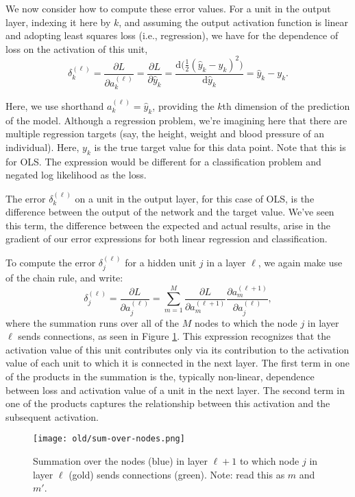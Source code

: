 We now consider how to compute these error values.  For a unit in the output layer, indexing it here by $k$,  and assuming the output activation function is linear and adopting least squares loss (i.e., regression), we have  for the dependence of loss on the activation of this unit,
%
\begin{equation*}
  \delta^{(\ell)}_{k} = \frac{\partial L}{\partial a^{(\ell)}_k} =
 \frac{\partial L}{\partial \hat{y}_k} =
  \frac{\mathrm{d} \big( \frac{1}{2}(\hat{y}_k- y_k)^2 \big)}{\mathrm{d} \hat{y}_{k}} = \hat{y}_{k} - y_{k}.
\end{equation*}

Here, we use shorthand $a^{(\ell)}_k=\hat{y}_k$, providing the $k$th dimension of the  prediction  of the  model. Although a regression problem, we're imagining here that there are multiple regression targets (say, the height, weight and blood pressure of an individual). Here, $y_k$ is the true target value for this data point. Note that this is for OLS. The expression would be different for a classification problem and negated log likelihood as the loss.

The error $\delta_k^{(\ell)}$ on a unit in the output layer, for this case of OLS, is the difference between the output of the network and the target value. We've seen this term, the difference between the expected and actual results, arise in the gradient of our error expressions for both linear regression and classification.
\fi

To compute the error $\delta^{(\ell)}_{j}$ for a hidden unit $j$ in a layer $\ell$, we again make use of the chain rule, and write:
%
\begin{equation} \label{backprop-for-deltas}
	\delta^{(\ell)}_{j} = \frac{\partial L}{\partial a^{(\ell)}_{j}} = \sum_{m=1}^{M} \frac{\partial L}{\partial a^{(\ell+1)}_{m}} \frac{\partial a^{(\ell+1)}_{m}}{\partial a_{j}^{(\ell)}}, 
\end{equation}
where the summation runs over all of the $M$ nodes to which the node $j$ in layer $\ell$ sends connections, as seen in Figure \ref{fig:sum-over-nodes}. This expression recognizes that the activation value of this unit contributes only via its contribution to the activation value of each unit to which it is connected in the next layer. The first term in
one of the  products in the summation is the, typically non-linear, dependence between loss and activation value of a unit in the next layer. The second term in one of the products captures the relationship between this activation and the subsequent activation.
%
%
\begin{figure}
    \centering
    \texttt{[image: old/sum-over-nodes.png]}
    \caption{Summation over the nodes (blue) in layer $\ell+1$ to which node $j$ in layer $\ell$ (gold) sends connections (green). Note: read this as $m$ and $m'$.}
    \label{fig:sum-over-nodes}
\end{figure}


